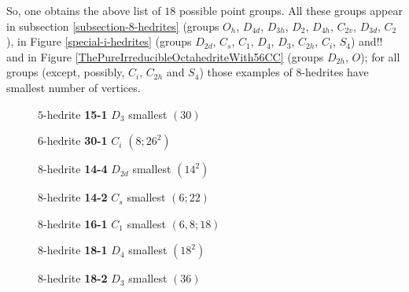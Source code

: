 \documentclass[12pt]{article}
\begin{document}
So, one obtains the above list of $18$ possible point groups. All these groups appear in subsection \ref{subsection-8-hedrites} (groups 
$O_h$, $D_{4d}$, $D_{3h}$, $D_{2}$, $D_{4h}$, $C_{2v}$, $D_{3d}$, $C_2$),
in Figure \ref{special-i-hedrites} (groups $D_{2d}$, $C_s$, $C_1$, $D_4$, $D_{3}$, $C_{2h}$, $C_{i}$, $S_4$) and!! 
and in Figure \ref{ThePureIrreducibleOctahedriteWith56CC} (groups $D_{2h}$, $O$); for all groups (except, possibly, $C_i$, $C_{2h}$ and $S_4$) those examples of $8$-hedrites have smallest number of vertices.


\begin{figure}
{\small
\begin{minipage}[t]{4cm}
\centering
\epsfxsize=4cm
\par
{$5$-hedrite {\bf 15-1} $D_3$ smallest $(30)$}
\end{minipage}
\begin{minipage}[t]{4cm}
\centering
\epsfxsize=4cm
\par
{$6$-hedrite {\bf 30-1} $C_i$ $(8;26^2)$}
\end{minipage}
\begin{minipage}[t]{4cm}
\centering
\epsfxsize=4cm
\par
{$8$-hedrite {\bf 14-4} $D_{2d}$ smallest $(14^2)$}
\end{minipage}
\begin{minipage}[t]{4cm}
\centering
\epsfxsize=4cm
\par
{$8$-hedrite {\bf 14-2} $C_s$ smallest $(6;22)$}
\end{minipage}
\begin{minipage}[t]{4cm}
\centering
\epsfxsize=4cm
\par
{$8$-hedrite {\bf 16-1} $C_1$ smallest $(6, 8; 18)$}
\end{minipage}
\begin{minipage}[t]{4cm}
\centering
\epsfxsize=4cm
\par
{$8$-hedrite {\bf 18-1} $D_4$ smallest $(18^2)$}
\end{minipage}
\begin{minipage}[t]{4cm}
\centering
\epsfxsize=4cm
\par
{$8$-hedrite {\bf 18-2} $D_3$ smallest $(36)$}
\end{minipage}
\begin{minipage}[t]{4cm}
\centering

\end{minipage}}
\end{figure}
\end{document}
